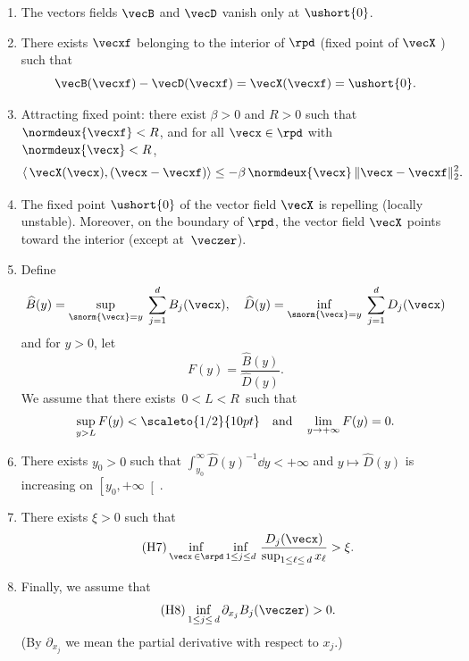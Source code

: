 \bgroup{}
\begin{enumerate}
\item \label{H1} The vectors fields $\vecB$ and $\vecD$ vanish only at $\ushort{0}$.
\item \label{H2} There exists $\vecxf$ belonging to the interior of $\rpd$ \textup{(}fixed point of $\vecX$
\textup{)} such that
\[
\vecB(\vecxf)-\vecD(\vecxf)=\vecX(\vecxf)=\ushort{0}.
\]
\item\label{H3} Attracting fixed point: there exist $\beta>0$ and $R>0$ such that $\normdeux{\vecxf}<R$, and for all $\vecx\in \rpd$ with $\normdeux{\vecx}<R$,
\begin{equation}\label{Xalpha}
\langle\, \vecX(\vecx), (\vecx-\vecxf)\rangle \le -\beta\, \normdeux{\vecx}\, \|\vecx-\vecxf\|_{2}^2.
\end{equation}
\item\label{H4} The fixed point $\ushort{0}$ of the vector field $\vecX$ is repelling (locally unstable).
Moreover, on the boundary of $\rpd$, the vector field $\vecX$ points toward the interior (except at~$\veczer$).
\item\label{H5} Define
\[
\widehat{B}(y)=\sup_{\snorm{\vecx}=y}\;\sum_{j=1}^{d}B_{j}(\vecx),\quad \widehat{D}(y)=
\inf_{\snorm{\vecx}=y}\;\sum_{j=1}^{d}D_{j}(\vecx)
\]
and for $y>0$, let
\[
F(y)= \frac{\widehat{B}(y)}{\widehat{D}(y)}.
\]
We assume that there exists $\,0<L<R\,$ such that
\[
\sup_{y>L} F(y)<\scaleto{1/2}{10pt}\quad\text{and}\quad \lim_{y\to+\infty} F(y)=0.
\]

\item\label{H6} There exists $y_{0}>0$ such that $\int_{y_{0}}^{\infty} \widehat{D}(y)^{-1}\dd y<+\infty$ and $y\mapsto \widehat{D}(y)$ is
increasing on $\left[y_{0},+\infty\right[$.
\item
There exists $\xi>0$ such that
\begin{equation}
\label{cond:mort}
\tag{H7}
\inf_{\vecx\,\in \srpd} \inf_{1\leq j\leq d}\, \frac{D_{j}(\vecx)}{\sup_{1\leq \ell\leq \,d} x_{\ell}} >\xi.
\end{equation}
\item
Finally, we assume that
\begin{equation}\label{cond:nais}\tag{H8}
\inf_{1\leq j\leq \, d}\partial_{x_{j}} B_{j}(\veczer) > 0.
\end{equation}
(By $\partial_{x_{j}}$ we mean the partial derivative with respect to $x_{j}$.)
\end{enumerate}
\egroup

